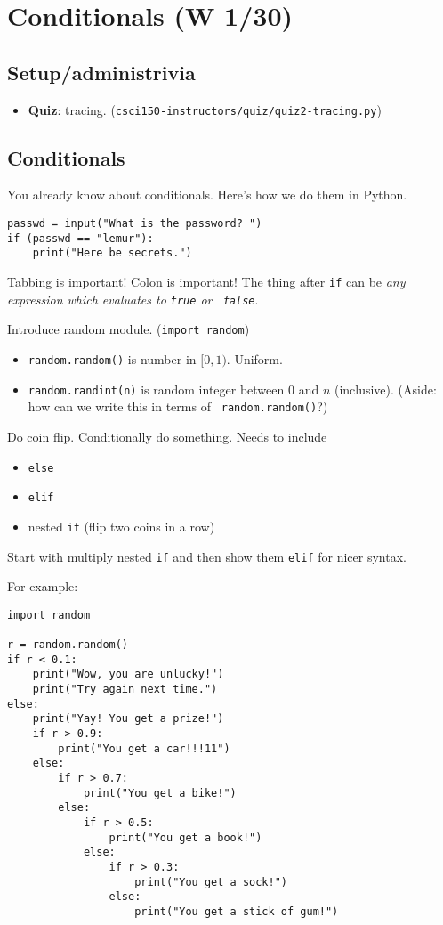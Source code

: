 \documentclass{article}
\newcommand{\ready}{\textcolor{Green}{\Checkmark}\xspace}
\begin{document}
\section*{\ready Conditionals (W 1/30)}

\subsection*{Setup/administrivia}
\begin{itemize}
\item \ready \textbf{Quiz}: tracing. (\texttt{csci150-instructors/quiz/quiz2-tracing.py})
\end{itemize}

\subsection*{Conditionals}

You already know about conditionals.  Here's how we do them in Python.

\begin{verbatim}
passwd = input("What is the password? ")
if (passwd == "lemur"):
    print("Here be secrets.")
\end{verbatim}

Tabbing is important!  Colon is important!  The thing after {\tt if}
can be \emph{any expression which evaluates to {\tt true} or {\tt
    false}}.

Introduce random module. ({\tt import random})
\begin{itemize}
\item {\tt random.random()} is number in $[0,1)$. Uniform.
\item {\tt random.randint(n)} is random integer between $0$ and $n$
  (inclusive).  (Aside: how can we write this in terms of {\tt
    random.random()}?)
\end{itemize}
Do coin flip.  Conditionally do something.  Needs to include
\begin{itemize}
\item {\tt else}
\item {\tt elif}
\item nested {\tt if}  (flip two coins in a row)
\end{itemize}

Start with multiply nested {\tt if} and then show them {\tt elif} for
nicer syntax.

For example:
\begin{verbatim}
import random

r = random.random()
if r < 0.1:
    print("Wow, you are unlucky!")
    print("Try again next time.")
else:
    print("Yay! You get a prize!")
    if r > 0.9:
        print("You get a car!!!11")
    else:
        if r > 0.7:
            print("You get a bike!")
        else:
            if r > 0.5:
                print("You get a book!")
            else:
                if r > 0.3:
                    print("You get a sock!")
                else:
                    print("You get a stick of gum!")
\end{verbatim}
\end{document}
